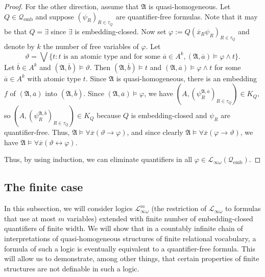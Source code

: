 \documentclass{ndjflart}
\theoremstyle{plain}
\theoremstyle{definition}
\numberwithin{equation}{section}
\DeclareMathOperator{\emb}{emb}
\begin{document}
\begin{proof}
For the other direction, assume that $\mathfrak{A}$ is quasi-homogeneous.
Let $Q \in \mathcal{Q}_{\emb}$ and suppose $(\psi_R)_{R \in \tau_Q}$ are
quantifier-free formulas.
Note that it may be that $Q = \exists$ since $\exists$ is embedding-closed.
Now set $\varphi := Q(\overline{x}_R\psi_R)_{R \in \tau_Q}$ and denote by $k$
the number of free variables of $\varphi$.
Let
\[
	\vartheta = \bigvee\{t \colon 
	t \text{ is an atomic type and for some } 
	\overline{a} \in A^k, (\mathfrak{A}, \overline{a}) \vDash \varphi \wedge t\}.
\]
Let $\overline{b} \in A^k$ and $(\mathfrak{A}, \overline{b}) \vDash \vartheta$.
Then $(\mathfrak{A},\overline{b}) \vDash t$ and
$(\mathfrak{A},\overline{a}) \vDash \varphi \wedge t$ for some
$\overline{a} \in A^k$ with atomic type $t$.
Since $\mathfrak{A}$ is quasi-homogeneous, there is an embedding $f$ of
$(\mathfrak{A},\overline{a})$ into $(\mathfrak{A},\overline{b})$.
Since $(\mathfrak{A},\overline{a}) \vDash \varphi$, we have
$(A,(\psi^{\mathfrak{A},\overline{a}}_R)_{R \in \tau_Q}) \in K_Q$,
so $(A,(\psi^{\mathfrak{A},\overline{b}}_R)_{R \in \tau_Q}) \in K_Q$
because $Q$ is embedding-closed and $\psi_R$ are quantifier-free.
Thus, $\mathfrak{A} \vDash \forall \overline{x}(\vartheta \rightarrow \varphi)$,
and since clearly
$\mathfrak{A} \vDash \forall \overline{x}(\varphi \rightarrow \vartheta)$,
we have
$\mathfrak{A} \vDash \forall \overline{x}(\vartheta \leftrightarrow \varphi)$.

Thus, by using induction, we can eliminate quantifiers in all 
$\varphi \in \mathcal{L}_{\infty\omega}(\mathcal{Q}_{\emb})$.
\end{proof}


\subsection{The finite case}

In this subsection, we will consider logics $\mathcal{L}_{\infty\omega}^m$
(the restriction of $\mathcal{L}_{\infty\omega}$ to formulas that use at most
$m$ variables) extended with finite number of em\-bed\-ding-closed quantifiers
of finite width.
We will show that in a countably infinite chain of interpretations of 
quasi-homogeneous structures
of finite relational vocabulary, a formula of such a logic is eventually
equivalent to a quantifier-free formula.
This will allow us to demonstrate, among other things, that certain properties
of finite structures are not definable in such a logic.
\end{document}

